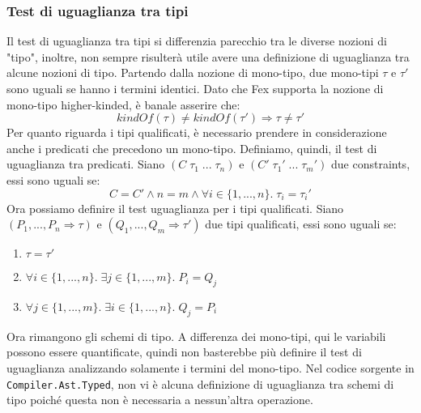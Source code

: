 \documentclass[10pt,a4paper]{article}
\begin{document}
\hypertarget{Test di uguaglianza tra tipi}{\subsubsection{Test di uguaglianza tra tipi}}
Il test di uguaglianza tra tipi si differenzia parecchio tra le diverse nozioni di "tipo", inoltre, non sempre risulterà
utile avere una definizione di uguaglianza tra alcune nozioni di tipo. Partendo dalla nozione di mono-tipo, due
mono-tipi $ \tau $ e $ \tau' $ sono uguali se hanno i termini identici. Dato che Fex supporta la nozione di mono-tipo
higher-kinded, è banale asserire che:
\[ kindOf(\tau) \neq kindOf(\tau') \Longrightarrow \tau \neq \tau' \]
Per quanto riguarda i tipi qualificati, è necessario prendere in considerazione anche i predicati che precedono un
mono-tipo. Definiamo, quindi, il test di uguaglianza tra predicati. Siano $ (C \; \tau_1 \; ... \; \tau_n) $ e
$ (C' \; \tau_1' \; ... \; \tau_m') $ due constraints, essi sono uguali se:
\[ C = C' \wedge n = m \wedge \forall i \in \{1, ..., n\}. \; \tau_i = \tau_i' \]
Ora possiamo definire il test uguaglianza per i tipi qualificati. Siano $ (P_1, ..., P_n \Rightarrow \tau) $ e
$ (Q_1, ..., Q_m \Rightarrow \tau') $ due tipi qualificati, essi sono uguali se:
\begin{enumerate}
    \item $ \tau = \tau' $
    \item $ \forall i \in \{1, ..., n\}. \; \exists j \in \{1, ..., m\}. \; P_i = Q_j $
    \item $ \forall j \in \{1, ..., m\}. \; \exists i \in \{1, ..., n\}. \; Q_j = P_i $
\end{enumerate}
Ora rimangono gli schemi di tipo. A differenza dei mono-tipi, qui le variabili possono essere quantificate, quindi non
basterebbe più definire il test di uguaglianza analizzando solamente i termini del mono-tipo. Nel codice sorgente in
\texttt{Compiler.Ast.Typed}, non vi è alcuna definizione di uguaglianza tra schemi di tipo poiché questa non è necessaria
a nessun'altra operazione.
\end{document}
